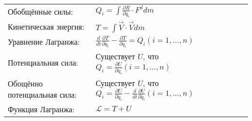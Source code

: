 \documentclass{article}
\begin{document}
\begin{tabular}{ |p{3.8cm}|p{5.7cm}|p{6cm}|p{3.5cm}|  }
                                                                             &  %
                                                                             \\ %
\hline
Обобщённые силы:                                                             &  %
$Q_i = \int \frac{\partial R}{\partial q_i} \cdot F^d dm$                    &  %
                                                                             &  %
                                                                             \\ %
\hline
Кинетическая энергия:                                                        &  %
$T = \int {\vec{V} \cdot \vec{V} dm}$                                        &  %
                                                                             &  %
                                                                             \\ %
\hline
Уравнение Лагранжа:                                                          &  %
$\frac{d}{dt} \frac{\partial T}{\partial \dot{q_i}} -
\frac{\partial T}{\partial q_i} = Q_i (i = 1, \dots, n)$                     &  %
                                                                             &  %
                                                                             \\ %
\hline
Потенциальная сила:                                                          &  %
Существует $U$, что $Q_i = \frac{\partial U}{\partial q_i} (i = 1, \dots, n)$&  %
                                                                             &  %
                                                                             \\ %
\hline
Обощённо потенциальная сила:                                                 &  %
Существует $U$, что $Q_i = \frac{\partial U}{\partial q_i} -
 \frac{d}{dt} \frac{\partial U}{\partial \dot{q_i}} (i = 1, \dots, n)$       &  %
                                                                             &  %
                                                                             \\ %
\hline
Функция Лагранжа:                                                            &  %
$\mathcal{L} = T + U$                                                        &  %
                                                                             &  %

\end{tabular}
\end{document}
